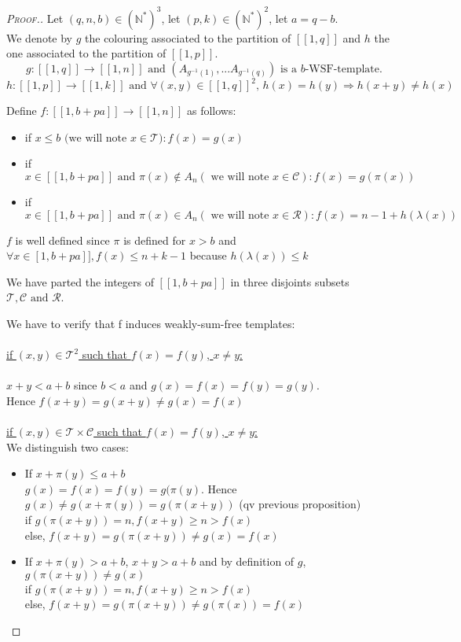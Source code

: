 \begin{proof}[\textsc{Proof.}]
Let \((q,n,b) \in (\mathbb{N}^*)^3\), let \( (p,k) \in (\mathbb{N}^*)^2\), let \(a=q-b\). \\
We denote by \(g\) the colouring associated to the partition of \([\![1,q]\!]\) and \(h\) the
one associated to the partition of \([\![1,p]\!]\).
\[ g : [\![1,q]\!] \longrightarrow [\![1,n]\!] \text{ and } (A_{g^{-1}(1)},...A_{g^{-1}(q)})\text{ is a \(b\)-WSF-template.}
\]
\[h : [\![1,p]\!] \longrightarrow [\![1,k]\!] \text{ and } \forall (x,y) \in [\![1,q]\!]^2 \text{, } h(x) = h(y)
\Longrightarrow h(x+y) \neq h(x)
\]

Define \( f : [\![1,b+pa]\!] \longrightarrow [\![1,n]\!] \) as follows:

\begin{itemize}
\item if  \(x\leqslant b \text{ (we will note }x \in \mathcal{T}): f(x)=g(x)\)
\item if \( x \in [\![1,b+pa]\!] \text{ and } \pi(x) \notin A_n (\text{ we will note } x \in \mathcal{C}): f(x)=g(\pi(x))\)
\item if \( x \in [\![1,b+pa]\!]  \text{ and }\pi(x) \in A_n (\text{ we will note } x \in \mathcal{R}): f(x)=n-1+h(\lambda(x))\)
\end{itemize}

\(f\) is well defined since \(\pi\) is defined for \(x>b\) and \(\forall x \in \![1,b+pa]\!], f(x)\leqslant n+k-1\) because \(h(\lambda(x))\leqslant k\)

We have parted the integers of \([\![1,b+pa]\!]\) in three disjoints subsets \(\mathcal{T},\mathcal{C} \text{ and } \mathcal{R}\).

We have to verify that f induces weakly-sum-free templates:\\
\\
\underline{if \((x,y) \in \mathcal{T}^2\) such that \(f(x)=f(y)\), \(x \neq y\):}\\
\\\(x+y<a+b\) since \(b<a\) and \(g(x)=f(x)=f(y)=g(y)\).
\\Hence \(f(x+y)=g(x+y)\neq g(x)=f(x)\)
\\\\
\underline{if \((x,y) \in \mathcal{T} \times \mathcal{C}\) such that \(f(x)=f(y)\), \(x \neq y\):}\\
We distinguish two cases:


\begin{itemize}
\item If \(x+\pi(y)\leqslant a+b\)
\\\(g(x)=f(x)=f(y)=g(\pi(y)\). Hence \(g(x)\neq g(x+\pi(y))=g(\pi(x+y))\) (qv previous proposition)
\\if \(g(\pi(x+y))=n, f(x+y)\geqslant n > f(x)\)
\\else, \(f(x+y)=g(\pi(x+y))\neq g(x)=f(x)\)
\item If \(x+\pi(y)> a+b\), \(x+y>a+b\) and by definition of \(g\), \(g(\pi(x+y))\neq g(x)\)
\\if \(g(\pi(x+y))=n, f(x+y)\geqslant n > f(x)\)
\\else, \(f(x+y)=g(\pi(x+y))\neq g(\pi(x))=f(x)\)
\end{itemize}



\end{proof}
